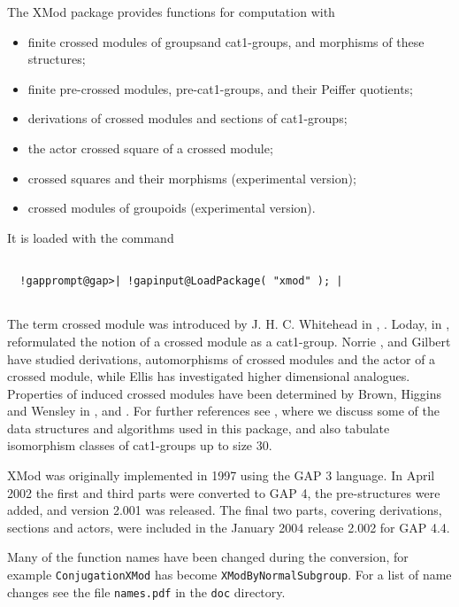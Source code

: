 \documentclass[a4paper,11pt]{report}
\begin{document}
{
  The \textsf{XMod} package provides functions for computation with 
\begin{itemize}
\item  finite crossed modules of groupsand cat1-groups, and morphisms of these
structures; 
\item  finite pre-crossed modules, pre-cat1-groups, and their Peiffer quotients; 
\item  derivations of crossed modules and sections of cat1-groups; 
\item  the actor crossed square of a crossed module; 
\item  crossed squares and their morphisms (experimental version); 
\item  crossed modules of groupoids (experimental version). 
\end{itemize}
 It is loaded with the command 
\begin{Verbatim}[commandchars=!@|,fontsize=\small,frame=single,label=Example]
  
  !gapprompt@gap>| !gapinput@LoadPackage( "xmod" ); |
  
\end{Verbatim}
 

 The term crossed module was introduced by J. H. C. Whitehead in \cite{W2}, \cite{W1}. Loday, in \cite{L1}, reformulated the notion of a crossed module as a cat1-group. Norrie \cite{N1}, \cite{N2} and Gilbert \cite{G1} have studied derivations, automorphisms of crossed modules and the actor of a
crossed module, while Ellis \cite{E1} has investigated higher dimensional analogues. Properties of induced crossed
modules have been determined by Brown, Higgins and Wensley in \cite{BH1}, \cite{BW1} and \cite{BW2}. For further references see \cite{AW1}, where we discuss some of the data structures and algorithms used in this
package, and also tabulate isomorphism classes of cat1-groups up to size $30$. 

 \textsf{XMod} was originally implemented in 1997 using the \textsf{GAP} 3 language. In April 2002 the first and third parts were converted to \textsf{GAP} 4, the pre-structures were added, and version 2.001 was released. The final
two parts, covering derivations, sections and actors, were included in the
January 2004 release 2.002 for \textsf{GAP} 4.4. 

 Many of the function names have been changed during the conversion, for
example \texttt{ConjugationXMod} has become \texttt{XModByNormalSubgroup}. For a list of name changes see the file \texttt{names.pdf} in the \texttt{doc} directory. 

}
\end{document}
